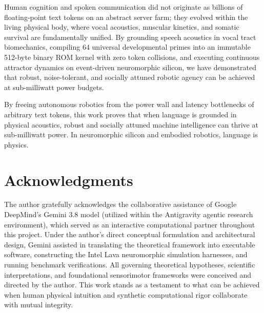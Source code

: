 \documentclass[journal,twocolumn]{IEEEtran}
\begin{document}
Human cognition and spoken communication did not originate as billions of floating-point text tokens on an abstract server farm; they evolved within the living physical body, where vocal acoustics, muscular kinetics, and somatic survival are fundamentally unified. By grounding speech acoustics in vocal tract biomechanics, compiling 64 universal developmental primes into an immutable 512-byte binary ROM kernel with zero token collisions, and executing continuous attractor dynamics on event-driven neuromorphic silicon, we have demonstrated that robust, noise-tolerant, and socially attuned robotic agency can be achieved at sub-milliwatt power budgets.

By freeing autonomous robotics from the power wall and latency bottlenecks of arbitrary text tokens, this work proves that when language is grounded in physical acoustics, robust and socially attuned machine intelligence can thrive at sub-milliwatt power. In neuromorphic silicon and embodied robotics, language is physics.

\section*{Acknowledgments}
The author gratefully acknowledges the collaborative assistance of Google DeepMind's Gemini 3.8 model (utilized within the Antigravity agentic research environment), which served as an interactive computational partner throughout this project. Under the author's direct conceptual formulation and architectural design, Gemini assisted in translating the theoretical framework into executable software, constructing the Intel Lava neuromorphic simulation harnesses, and running benchmark verifications. All governing theoretical hypotheses, scientific interpretations, and foundational sensorimotor frameworks were conceived and directed by the author. This work stands as a testament to what can be achieved when human physical intuition and synthetic computational rigor collaborate with mutual integrity.



\end{document}
